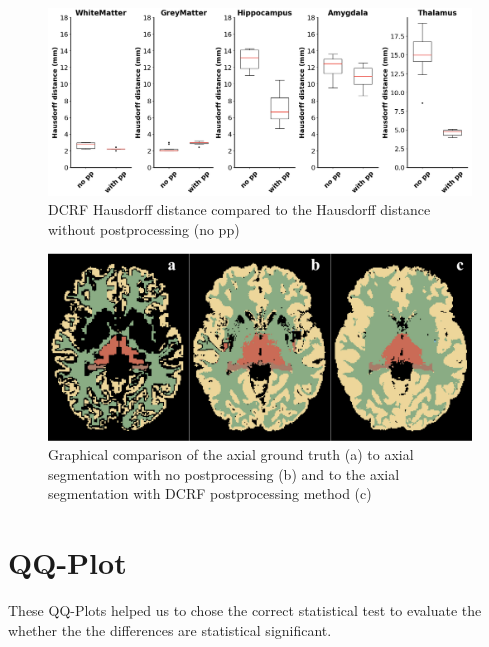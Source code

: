 \documentclass[journal]{IEEEtran}
\begin{document}
\begin{figure}[h!]
\centering
\includegraphics[width=4.9in]{img/boxplots/DCRF-HD.png}
\caption{DCRF Hausdorff distance compared to the Hausdorff distance without postprocessing (no pp)}
\label{fig_dcrf-hd_appendix}
\end{figure}
\begin{figure}[h!]
\centering

\includegraphics[width=4.9in]{img/boxplots/DCRF.png}
\caption{Graphical comparison of the axial ground truth (a) to axial segmentation with no postprocessing (b) and to the axial segmentation with DCRF postprocessing method (c) }
\label{fig_dcrf_appendix}
\end{figure}

\clearpage
\newpage
\section{QQ-Plot}
\label{sec_qq}
These QQ-Plots helped us to chose the correct statistical test to evaluate the whether the the differences are statistical significant. 
\end{document}
